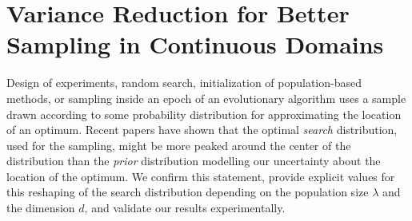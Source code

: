 

 
\chapter{Variance Reduction for Better Sampling in Continuous Domains}
\label{paper:ppsn-rescaling}

Design of experiments, random search, initialization of population-based methods, or sampling inside an epoch of an evolutionary algorithm uses a sample drawn according to some probability distribution for approximating the location of an optimum. Recent papers have shown that the optimal {\textit{search}} distribution, used for the sampling, might be more peaked around the center of the distribution than the {\textit{prior}} distribution modelling our uncertainty about the location of the optimum.
We confirm this statement, provide explicit values for this reshaping of the search distribution depending on the population size $\lambda$ and the dimension $d$, and validate our results experimentally.


